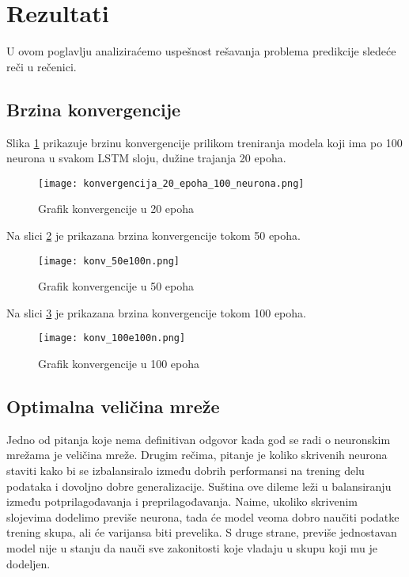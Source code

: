 \documentclass[a4paper]{article}
\begin{document}
\section{Rezultati}

U ovom poglavlju analiziraćemo uspešnost rešavanja problema predikcije sledeće reči u rečenici. 

\subsection{Brzina konvergencije}

Slika \ref{fig:konv_20} prikazuje brzinu konvergencije prilikom treniranja modela koji ima po 100 neurona u svakom LSTM sloju, dužine trajanja 20 epoha.

\begin{figure}[htp]
    \centering
    \texttt{[image: konvergencija\_20\_epoha\_100\_neurona.png]}
    \caption{Grafik konvergencije u 20 epoha}
    \label{fig:konv_20}
\end{figure}

Na slici \ref{fig:konv_50} je prikazana brzina konvergencije tokom 50 epoha.

\begin{figure}[htp]
    \centering
    \texttt{[image: konv\_50e100n.png]}
    \caption{Grafik konvergencije u 50 epoha}
    \label{fig:konv_50}
\end{figure}


Na slici \ref{fig:konv_100} je prikazana brzina konvergencije tokom 100 epoha.

\begin{figure}[htp]
    \centering
    \texttt{[image: konv\_100e100n.png]}
    \caption{Grafik konvergencije u 100 epoha}
    \label{fig:konv_100}
\end{figure}


\subsection{Optimalna veličina mreže}

Jedno od pitanja koje nema definitivan odgovor kada god se radi o neuronskim mrežama je veličina mreže. Drugim rečima, pitanje je koliko skrivenih neurona staviti kako bi se izbalansiralo između dobrih performansi na trening delu podataka i dovoljno dobre generalizacije. Suština ove dileme leži u balansiranju između potprilagođavanja i preprilagođavanja. Naime, ukoliko skrivenim slojevima dodelimo previše neurona, tada će model veoma dobro naučiti podatke trening skupa, ali će varijansa biti prevelika. S druge strane, previše jednostavan model nije u stanju da nauči sve zakonitosti koje vladaju u skupu koji mu je dodeljen.
\end{document}
